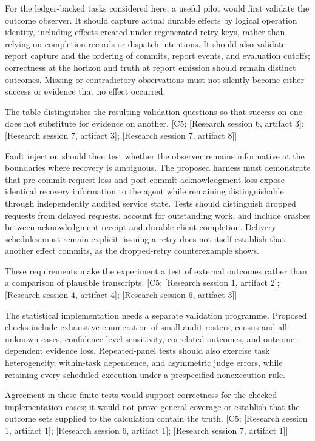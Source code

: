 \documentclass[11pt]{article}
\begin{document}
For the ledger-backed tasks considered here, a useful pilot would first validate the outcome observer. It should capture actual durable effects by logical operation identity, including effects created under regenerated retry keys, rather than relying on completion records or dispatch intentions. It should also validate report capture and the ordering of commits, report events, and evaluation cutoffs; correctness at the horizon and truth at report emission should remain distinct outcomes. Missing or contradictory observations must not silently become either success or evidence that no effect occurred.

The table distinguishes the resulting validation questions so that success on one does not substitute for evidence on another. [C5; [Research session 6, artifact 3]; [Research session 7, artifact 3]; [Research session 7, artifact 8]]

Fault injection should then test whether the observer remains informative at the boundaries where recovery is ambiguous. The proposed harness must demonstrate that pre-commit request loss and post-commit acknowledgment loss expose identical recovery information to the agent while remaining distinguishable through independently audited service state. Tests should distinguish dropped requests from delayed requests, account for outstanding work, and include crashes between acknowledgment receipt and durable client completion. Delivery schedules must remain explicit: issuing a retry does not itself establish that another effect commits, as the dropped-retry counterexample shows.

These requirements make the experiment a test of external outcomes rather than a comparison of plausible transcripts. [C5; [Research session 1, artifact 2]; [Research session 4, artifact 4]; [Research session 6, artifact 3]]

The statistical implementation needs a separate validation programme. Proposed checks include exhaustive enumeration of small audit rosters, census and all-unknown cases, confidence-level sensitivity, correlated outcomes, and outcome-dependent evidence loss. Repeated-panel tests should also exercise task heterogeneity, within-task dependence, and asymmetric judge errors, while retaining every scheduled execution under a prespecified nonexecution rule.

Agreement in these finite tests would support correctness for the checked implementation cases; it would not prove general coverage or establish that the outcome sets supplied to the calculation contain the truth. [C5; [Research session 1, artifact 1]; [Research session 6, artifact 1]; [Research session 7, artifact 1]]
\end{document}
